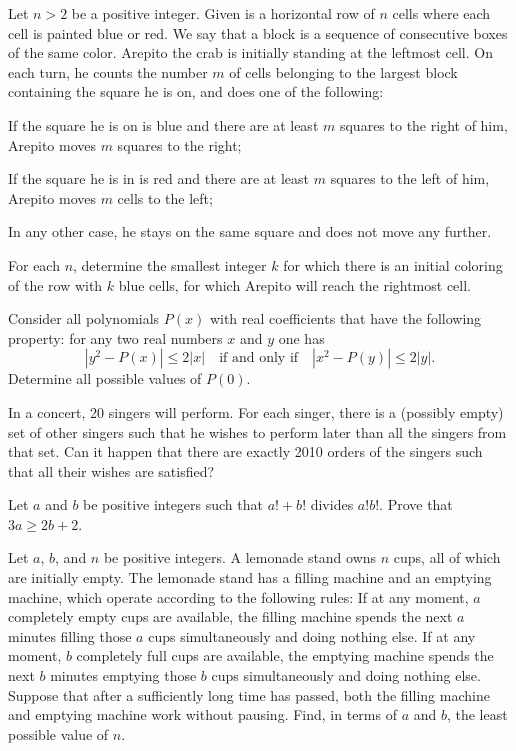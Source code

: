 \documentclass[11pt]{scrartcl}
\begin{document}
\begin{problem}[858562234779712]
Let $n> 2$ be a positive integer. Given is a horizontal row of $n$ cells where each cell is painted blue or red. We say that a block is a sequence of consecutive boxes of the same color. Arepito the crab is initially standing at the leftmost cell. On each turn, he counts the number $m$ of cells belonging to the largest block containing the square he is on, and does one of the following:

If the square he is on is blue and there are at least $m$ squares to the right of him, Arepito moves $m$ squares to the right;

If the square he is in is red and there are at least $m$ squares to the left of him, Arepito moves $m$ cells to the left;

In any other case, he stays on the same square and does not move any further.

For each $n$, determine the smallest integer $k$ for which there is an initial coloring of the row with $k$ blue cells, for which Arepito will reach the rightmost cell.
\end{problem}
\begin{problem}[861953008482666]
Consider all polynomials $P(x)$ with real coefficients that have the following property: for any two real numbers $x$ and $y$ one has\[|y^2-P(x)|\le 2|x|\quad\text{if and only if}\quad |x^2-P(y)|\le 2|y|.\]Determine all possible values of $P(0)$.
\end{problem}
\begin{problem}[866307541115519]
In a concert, 20 singers will perform. For each singer, there is a (possibly empty) set of other singers such that he wishes to perform later than all the singers from that set. Can it happen that there are exactly 2010 orders of the singers such that all their wishes are satisfied?
\end{problem}
\begin{problem}[869040684570675]
	Let $a$ and $b$ be positive integers such that $a! + b!$ divides $a!b!$. Prove that $3a \ge 2b + 2$.
\end{problem}
\begin{problem}[869501852347427]
Let \(a\), \(b\), and \(n\) be positive integers. A lemonade stand owns \(n\) cups, all of which are initially empty. The lemonade stand has a filling machine and an emptying machine, which operate according to the following rules:
If at any moment, \(a\) completely empty cups are available, the filling machine spends the next \(a\) minutes filling those \(a\) cups simultaneously and doing nothing else.
If at any moment, \(b\) completely full cups are available, the emptying machine spends the next \(b\) minutes emptying those \(b\) cups simultaneously and doing nothing else.
Suppose that after a sufficiently long time has passed, both the filling machine and emptying machine work without pausing. Find, in terms of \(a\) and \(b\), the least possible value of \(n\).
\end{problem}
\end{document}
